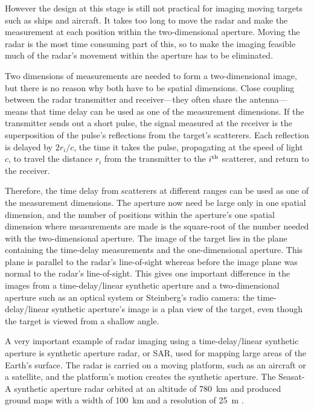 However the design at this stage is still not practical for imaging moving 
targets such as ships and aircraft.  It takes too long to move the radar and
make the measurement at each position within the two-dimensional aperture.  
Moving the radar is the most time consuming part of this, so to make the
imaging feasible much of the radar's movement within the aperture has 
to be eliminated.

Two dimensions of measurements are needed to form a two-dimensional image,
but there is no reason why both have to be spatial dimensions.  Close
coupling between the radar transmitter and receiver---they often share the
antenna---means that time delay can be used as one of the measurement
dimensions.  If the transmitter sends out a short pulse, the signal measured
at the receiver is the superposition of the pulse's reflections from the
target's scatterers.  Each reflection is delayed by
$2r_i/c$, the time it takes the pulse, propagating at the speed of light $c$,
to travel the distance $r_i$ from the transmitter to the $i^{\rm th}$
scatterer, and return to the receiver.  

Therefore, the time delay from scatterers at different ranges can be used 
as one of the measurement dimensions.  The aperture
now need be large only in one spatial dimension, and the number of
positions within the aperture's one spatial dimension where measurements 
are made is the
square-root of the number needed with the two-dimensional aperture.
The image of the target lies in the plane containing the time-delay
measurements and the one-dimensional aperture.  This plane is parallel to
the radar's line-of-sight whereas before the image plane was normal to the
radar's line-of-sight.  This gives one important difference in the images from
a time-delay/linear synthetic aperture and a two-dimensional aperture such 
as an optical system or Steinberg's radio camera: the time-delay/linear
synthetic aperture's image is a plan view of the target, even though the
target is viewed from a shallow angle.

A very important example of radar imaging using a time-delay/linear synthetic 
aperture is synthetic aperture radar, or SAR, used for mapping
large areas of the Earth's surface.  The radar is carried on a moving
platform, such as an aircraft or a satellite, and the platform's motion
creates the synthetic aperture.  The Seasat-A synthetic aperture radar 
orbited at an altitude of 780~km and produced ground maps with a width of
100~km and a resolution of 25~m \cite[ch. 22]{Sko90}.

